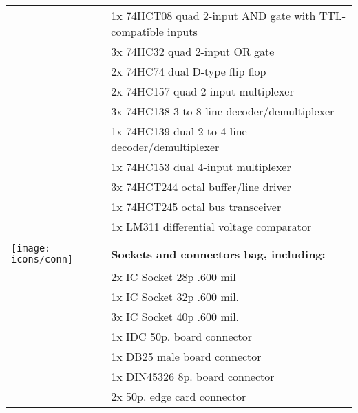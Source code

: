 \begin{longtable}{m{10mm}|l}
	                                      & 1x 74HCT08 quad 2-input AND gate with TTL-compatible inputs \\
	                                      & 3x 74HC32 quad 2-input OR gate                              \\
	                                      & 2x 74HC74 dual D-type flip flop                             \\
	                                      & 2x 74HC157 quad 2-input multiplexer                         \\
	                                      & 3x 74HC138 3-to-8 line decoder/demultiplexer                \\
	                                      & 1x 74HC139 dual 2-to-4 line decoder/demultiplexer           \\
	                                      & 1x 74HC153 dual 4-input multiplexer                         \\
	                                      & 3x 74HCT244 octal buffer/line driver                        \\
	                                      & 1x 74HCT245 octal bus transceiver                           \\
	                                      & 1x LM311 differential voltage comparator                    \\
	                                      &                                                             \\
	\texttt{[image: icons/conn]}          & {\bf Sockets and connectors bag, including:}                \\
	                                      & 2x IC Socket 28p .600 mil                                   \\
	                                      & 1x IC Socket 32p .600 mil.                                  \\
	                                      & 3x IC Socket 40p .600 mil.                                  \\
	                                      & 1x IDC 50p. board connector                                 \\
	                                      & 1x DB25 male board connector                                \\
	                                      & 1x DIN45326 8p. board connector                             \\
	                                      & 2x 50p. edge card connector                                 \\

\end{longtable}
